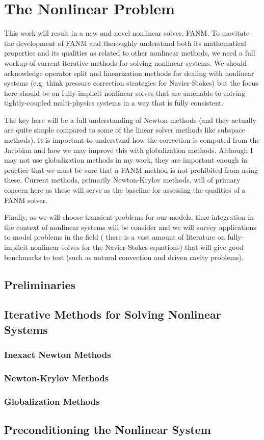 \chapter{The Nonlinear Problem}
\label{ch:nonlinear_problem}

This work will result in a new and novel nonlinear solver, FANM. To
movitate the development of FANM and thoroughly understand both its
mathematical properties and its qualities as related to other
nonlinear methods, we need a full workup of current iterative methods
for solving nonlinear systems. We should acknowledge operator split
and linearization methods for dealing with nonlinear systems
(e.g. think pressure correction strategies for Navier-Stokes) but the
focus here should be on fully-implicit nonlinear solves that are
amenable to solving tightly-coupled multi-physics systems in a way that
is fully consistent.

The key here will be a full understanding of Newton methods (and they
actually are quite simple compared to some of the linear solver
methods like subspace methods). It is important to understand how the
correction is computed from the Jacobian and how we may improve this
with globalization methods. Although I may not use globalization
methods in my work, they are important enough in practice that we must
be sure that a FANM method is not prohibited from using these. Current
methods, primarily Newton-Krylov methods, will of primary concern here
as these will serve as the baseline for assessing the qualities of a
FANM solver. 

Finally, as we will choose transient problems for our models, time
integration in the context of nonlinear systems will be consider and
we will survey applications to model problems in the field ( there is
a vast amount of literature on fully-implicit nonlinear solves for the
Navier-Stokes equations) that will give good benchmarks to test (such
as natural convection and driven cavity problems).

\section{Preliminaries}
\label{sec:nonlinear_preliminaries}

\section{Iterative Methods for Solving Nonlinear Systems}
\label{sec:nonlinear_methods}

\subsection{Inexact Newton Methods}
\label{subsec:newton_methods}

\subsection{Newton-Krylov Methods}
\label{subsec:newton_krylov_methods}

\subsection{Globalization Methods}
\label{subsec:globalization_methods}

\section{Preconditioning the Nonlinear System}
\label{sec:nonlinear_preconditioning}
